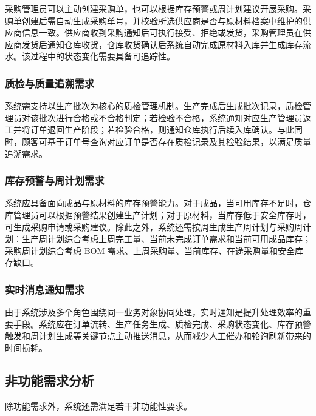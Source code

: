 采购管理员可以主动创建采购单，也可以根据库存预警或周计划建议开展采购。采购单创建后需自动生成采购单号，并校验所选供应商是否与原材料档案中维护的供应商信息一致。供应商收到采购通知后可执行接受、拒绝或发货，采购管理员在供应商发货后通知仓库收货，仓库收货确认后系统自动完成原材料入库并生成库存流水。该过程中的状态变化需要具备可追踪性。

\subsubsection{质检与质量追溯需求}

系统需支持以生产批次为核心的质检管理机制。生产完成后生成批次记录，质检管理员对该批次进行合格或不合格判定；若检验不合格，系统通知对应生产管理员返工并将订单退回生产阶段；若检验合格，则通知仓库执行后续入库确认。与此同时，顾客可基于订单号查询对应订单是否存在质检记录及其检验结果，以满足质量追溯需求。

\subsubsection{库存预警与周计划需求}

系统应具备面向成品与原材料的库存预警能力。对于成品，当可用库存不足时，仓库管理员可以根据预警结果创建生产计划；对于原材料，当库存低于安全库存时，可生成采购申请或采购建议。除此之外，系统还需按周生成生产周计划与采购周计划：生产周计划综合考虑上周完工量、当前未完成订单需求和当前可用成品库存；采购周计划综合考虑 BOM 需求、上周采购量、当前库存、在途采购量和安全库存缺口。

\subsubsection{实时消息通知需求}

由于系统涉及多个角色围绕同一业务对象协同处理，实时通知是提升处理效率的重要手段。系统应在订单流转、生产任务生成、质检完成、采购状态变化、库存预警触发和周计划生成等关键节点主动推送消息，从而减少人工催办和轮询刷新带来的时间损耗。

\subsection{非功能需求分析}

除功能需求外，系统还需满足若干非功能性要求。

